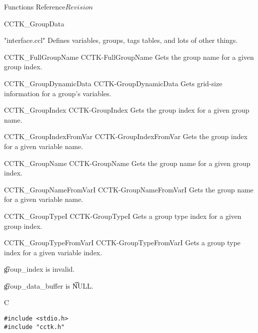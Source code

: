 \begin{cactuspart}{ Functions Reference}{}{$Revision$}
\begin{FunctionDescription}{CCTK\_GroupData}
\begin{SeeAlsoSection}
\begin{SeeAlso}{"interface.ccl"}
Defines variables, groups, tags tables, and lots of other things.
\end{SeeAlso}
\begin{SeeAlso2} {CCTK\_FullGroupName} {CCTK-FullGroupName}
Gets the group name for a given group index.
\end{SeeAlso2}
\begin{SeeAlso2} {CCTK\_GroupDynamicData} {CCTK-GroupDynamicData}
Gets grid-size information for a group's variables.
\end{SeeAlso2}
\begin{SeeAlso2} {CCTK\_GroupIndex} {CCTK-GroupIndex}
Gets the group index for a given group name.
\end{SeeAlso2}
\begin{SeeAlso2} {CCTK\_GroupIndexFromVar} {CCTK-GroupIndexFromVar}
Gets the group index for a given variable name.
\end{SeeAlso2}
\begin{SeeAlso2} {CCTK\_GroupName} {CCTK-GroupName}
Gets the group name for a given group index.
\end{SeeAlso2}
\begin{SeeAlso2} {CCTK\_GroupNameFromVarI} {CCTK-GroupNameFromVarI}
Gets the group name for a given variable name.
\end{SeeAlso2}
\begin{SeeAlso2} {CCTK\_GroupTypeI} {CCTK-GroupTypeI}
Gets a group type index for a given group index.
\end{SeeAlso2}
\begin{SeeAlso2} {CCTK\_GroupTypeFromVarI} {CCTK-GroupTypeFromVarI}
Gets a group type index for a given variable index.
\end{SeeAlso2}
\end{SeeAlsoSection}

\begin{ErrorSection}
\begin{Error}{-1}
{\t group\_index} is invalid.
\end{Error}
\begin{Error}{-2}
{\t group\_data\_buffer} is {\t NULL}.
\end{Error}
\end{ErrorSection}

\begin{ExampleSection}
\begin{Example}{C}
\begin{verbatim}
#include <stdio.h>
#include "cctk.h"


\end{verbatim}
\end{Example}
\end{ExampleSection}
\end{FunctionDescription}
\end{cactuspart}
